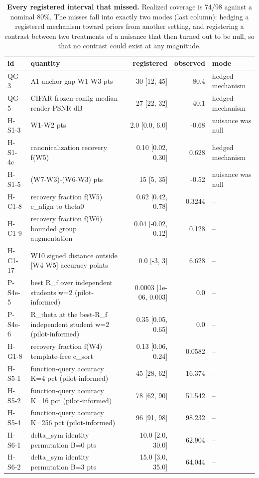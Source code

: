 \begin{table}[t]
\centering\small
\caption{\textbf{Every registered interval that missed.} Realized coverage is 74/98 against a nominal 80\%. The misses fall into exactly two modes (last column): hedging a registered mechanism toward priors from another setting, and registering a contrast between two treatments of a nuisance that then turned out to be null, so that no contrast could exist at any magnitude.}
\label{tab:calibration}
\begin{tabular}{@{}llrrl@{}}
\toprule
id & quantity & registered & observed & mode \\
\midrule
QG-3 & A1 anchor gap W1-W3 pts & 30 [12, 45] & 80.4 & hedged mechanism \\
QG-5 & CIFAR frozen-config median render PSNR dB & 27 [22, 32] & 40.1 & hedged mechanism \\
H-S1-3 & W1-W2 pts & 2.0 [0.0, 6.0] & -0.68 & nuisance was null \\
H-S1-4c & canonicalization recovery f(W5) & 0.10 [0.02, 0.30] & 0.628 & hedged mechanism \\
H-S1-5 & (W7-W3)-(W6-W3) pts & 15 [5, 35] & -0.52 & nuisance was null \\
H-C1-8 & recovery fraction f(W5) c\_align to theta0 & 0.62 [0.42, 0.78] & 0.3244 & -- \\
H-C1-9 & recovery fraction f(W6) bounded group augmentation & 0.04 [-0.02, 0.12] & 0.128 & -- \\
H-C1-17 & W10 signed distance outside [W4 W5] accuracy points & 0.0 [-3, 3] & 6.628 & -- \\
P-S4e-5 & best R\_f over independent students w=2 (pilot-informed) & 0.0003 [1e-06, 0.003] & 0.0 & -- \\
P-S4e-6 & R\_theta at the best-R\_f independent student w=2 (pilot-informed) & 0.35 [0.05, 0.65] & 0.0 & -- \\
H-G1-8 & recovery fraction f(W4) template-free c\_sort & 0.13 [0.06, 0.24] & 0.0582 & -- \\
H-S5-1 & function-query accuracy K=4 pct (pilot-informed) & 45 [28, 62] & 16.374 & -- \\
H-S5-2 & function-query accuracy K=16 pct (pilot-informed) & 78 [62, 90] & 51.542 & -- \\
H-S5-4 & function-query accuracy K=256 pct (pilot-informed) & 96 [91, 98] & 98.232 & -- \\
H-S6-1 & delta\_sym identity permutation B=0 pts & 10.0 [2.0, 30.0] & 62.904 & -- \\
H-S6-2 & delta\_sym identity permutation B=3 pts & 15.0 [3.0, 35.0] & 64.044 & -- \\

\end{tabular}
\end{table}
